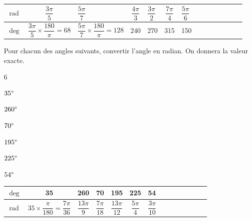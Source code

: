 \documentclass[11pt,a4paper]{article}  %
\begin{document}
\begin{corrBox}
	\renewcommand{\arraystretch}{2.6}
	\begin{tabular}{|Xc|Xc|Xc|Xc|Xc|Xc|Xc|}
		\hline $\operatorname{rad}$ & $\dfrac{3 \pi}{5}$ & $\dfrac{5 \pi}{7}$ & $\dfrac{4 \pi}{3}$ & $\dfrac{3 \pi}{2}$ & $\dfrac{7 \pi}{4}$ & $\dfrac{5 \pi}{6}$ \\
		\hline $\operatorname{deg}$ & $\dfrac{3 \pi}{5} \times \dfrac{180}{\pi}=68$ & $\dfrac{5 \pi}{7} \times \dfrac{180}{\pi}=128$ & 240 & 270 & 315 & 150 \\
		\hline
	\end{tabular}	
\end{corrBox}


Pour chacun des angles suivants, convertir l'angle en radian. On donnera la valeur exacte.
\begin{multicols}{6}
	\begin{enumMet}
		\item $35\degree$
		\item $260\degree$
		\item $70\degree$
		\item $195\degree$
		\item $225\degree$
		\item $54\degree$
	\end{enumMet}
\end{multicols}

\begin{corrBox}
	\renewcommand{\arraystretch}{2.6}
	\begin{tabular}{|Xc|Xc|Xc|Xc|Xc|Xc|Xc|}
		\hline $\operatorname{deg}$ & 35 & 260 & 70 & 195 & 225 & 54 \\
		\hline $\operatorname{rad}$ & $35 \times \dfrac{\pi}{180}=\dfrac{7 \pi}{36}$ & $\dfrac{13 \pi}{9}$ & $\dfrac{7 \pi}{18}$ & $\dfrac{13 \pi}{12}$ & $\dfrac{5 \pi}{4}$ & $\dfrac{3 \pi}{10}$ \\
		\hline
	\end{tabular}
\end{corrBox}

\exercice{}
\end{document}
